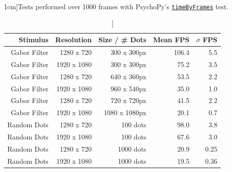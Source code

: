 \begin{table}
\caption[][1cm]{Tests performed over 1000 frames with PsychoPy's \href{https://github.com/psychopy/psychopy/blob/3.1/psychopy/demos/coder/timing/timeByFrames.py}{\texttt{timeByFrames}} test.}
    \begin{tabular}{rrr|rr}
        \toprule
        \textbf{Stimulus} & \textbf{Resolution} & \textbf{Size / \# Dots}& \textbf{Mean FPS} & \textbf{$\sigma$ FPS} \\
        \midrule 
        Gabor Filter & 1280 x 720  & 300 x 300px & 106.4 & 5.5 \\
        Gabor Filter & 1920 x 1080 & 300 x 300px & 75.2 & 3.5\\
        Gabor Filter & 1280 x 720 & 640 x 360px & 53.5 & 2.2\\ 
        Gabor Filter & 1920 x 1080 & 960 x 540px & 35.0 & 1.0 \\
        Gabor Filter & 1280 x 720 & 720 x 720px & 41.5 & 2.2 \\
        Gabor Filter & 1920 x 1080 & 1080 x 1080px & 20.1 & 0.7 \\
        Random Dots & 1280 x 720 & 100 dots & 98.0 & 3.8 \\
        Random Dots & 1920 x 1080 & 100 dots & 67.6 & 3.0 \\
        Random Dots & 1280 x 720 & 1000 dots & 20.9 & 0.25 \\
        Random Dots & 1920 x 1080 & 1000 dots & 19.5 & 0.36 \\
        \bottomrule
    \end{tabular}
    \label{tab:fpstests}
\end{table}
